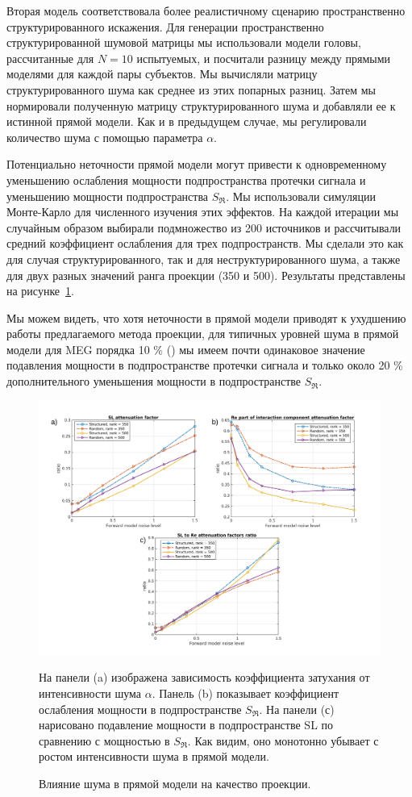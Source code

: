 Вторая модель соответствовала более реалистичному сценарию пространственно
структурированного искажения.  Для генерации пространственно структурированной
шумовой матрицы мы использовали модели головы, рассчитанные для $N=10$
испытуемых, и посчитали разницу между прямыми моделями для каждой пары
субъектов. Мы вычисляли матрицу структурированного шума как среднее из этих
попарных разниц. Затем мы нормировали полученную матрицу структурированного
шума и добавляли ее к истинной прямой модели. Как и в предыдущем случае, мы
регулировали количество шума с помощью параметра $\alpha$.

Потенциально неточности прямой модели могут привести к одновременному
уменьшению ослабления мощности подпространства протечки сигнала и уменьшению
мощности подпространства $S_{\Re}$.  Мы использовали симуляции Монте-Карло для
численного изучения этих эффектов.  На каждой итерации мы случайным образом
выбирали подмножество из 200 источников и рассчитывали средний коэффициент
ослабления для трех подпространств.  Мы сделали это как для случая
структурированного, так и для неструктурированного шума, а также для двух разных
значений ранга проекции (350 и 500). Результаты представлены на рисунке~\ref{fig:15}.

Мы можем видеть, что хотя неточности в прямой модели приводят к
ухудшению работы предлагаемого метода проекции, для типичных уровней
шума в прямой модели для MEG порядка 10 \% (\cite{Mosher1999}) мы имеем почти одинаковое значение
подавления мощности в подпространстве протечки сигнала и только около 20 \% дополнительного уменьшения мощности
в подпространстве $S_{\Re}$.

\begin{figure}[htbp]
\includegraphics[width=1\textwidth]{../images/psiicos_paper/Figure15_hr.jpg}
\caption{Влияние шума в прямой модели на качество проекции.}\label{fig:15} %
  На панели (a) изображена зависимость коэффициента затухания от интенсивности шума $\alpha$.
  Панель (b) показывает коэффициент ослабления мощности в подпространстве $S_{\Re}$.
  На панели (с) нарисовано подавление мощности в подпространстве SL по сравнению с мощностью в $S_{\Re}$.
  Как видим, оно монотонно убывает с ростом интенсивности шума в прямой модели.
 \end{figure}

